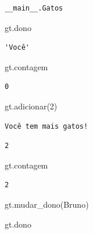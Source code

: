 \documentclass[
  letterpaper,
  DIV=11,
  numbers=noendperiod]{scrreprt}
\newenvironment{Shaded}{\begin{snugshade}}{\end{snugshade}}
\newcommand{\DecValTok}[1]{\textcolor[rgb]{0.68,0.00,0.00}{#1}}
\newcommand{\NormalTok}[1]{\textcolor[rgb]{0.00,0.23,0.31}{#1}}
\newcommand{\StringTok}[1]{\textcolor[rgb]{0.13,0.47,0.30}{#1}}
\begin{document}
\begin{verbatim}
__main__.Gatos
\end{verbatim}

\begin{Shaded}
\begin{Highlighting}[]
\NormalTok{gt.dono}
\end{Highlighting}
\end{Shaded}

\begin{verbatim}
'Você'
\end{verbatim}

\begin{Shaded}
\begin{Highlighting}[]
\NormalTok{gt.contagem}
\end{Highlighting}
\end{Shaded}

\begin{verbatim}
0
\end{verbatim}

\begin{Shaded}
\begin{Highlighting}[]
\NormalTok{gt.adicionar(}\DecValTok{2}\NormalTok{)}
\end{Highlighting}
\end{Shaded}

\begin{verbatim}
Você tem mais gatos!
\end{verbatim}

\begin{verbatim}
2
\end{verbatim}

\begin{Shaded}
\begin{Highlighting}[]
\NormalTok{gt.contagem}
\end{Highlighting}
\end{Shaded}

\begin{verbatim}
2
\end{verbatim}

\begin{Shaded}
\begin{Highlighting}[]
\NormalTok{gt.mudar\_dono(}\StringTok{\textquotesingle{}Bruno\textquotesingle{}}\NormalTok{)}
\end{Highlighting}
\end{Shaded}

\begin{Shaded}
\begin{Highlighting}[]
\NormalTok{gt.dono}
\end{Highlighting}
\end{Shaded}
\end{document}
